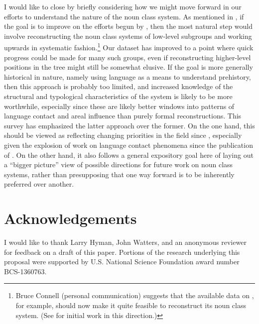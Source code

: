 \documentclass[output=paper ,collection	  ,collectionchapter ,biblatexbackend=biber   ]{langscibook}
\begin{document}
I would like to close by briefly considering how we might move forward in our
efforts to understand the nature of the  noun class system. As
mentioned in , if the goal is to improve on the efforts begun by
, then the most natural step would involve reconstructing
the noun class systems of low-level subgroups and working upwards in systematic
fashion.{\footnote{Bruce Connell (personal communication) suggests that the
available data on , for example, should now make it quite feasible to
reconstruct its noun class system. (See  for
initial work in this direction.)}} Our dataset has improved to a point where
quick progress could be made for many such groups, even if reconstructing
higher-level positions in the tree might still be somewhat elusive. If the goal
is more generally historical in nature, namely using language as a means to
understand  prehistory, then this approach is probably too limited,
and increased knowledge of the structural and typological characteristics of the
system is likely to be more worthwhile, especially since these are likely better
windows into patterns of language contact and areal influence than purely formal
reconstructions. This survey has emphasized the latter approach over the former.
On the one hand, this should be viewed as reflecting 
changing priorities in the field since , especially given
the explosion of work on language contact phenomena since the publication of
. On the other hand, it also follows a
general expository goal here of laying out a ``bigger picture'' view of possible
directions for future work on  noun class systems, rather
than presupposing that one way forward is to be inherently preferred over
another.
\section*{Acknowledgements}

I would like to thank Larry Hyman, John Watters, and an anonymous reviewer for feedback on a draft of this
paper. Portions of the research underlying this proposal were supported by U.S. National Science Foundation award number BCS-1360763.
 
{\sloppy
\printbibliography[heading=subbibliography,notkeyword=this]
}
\end{document}
